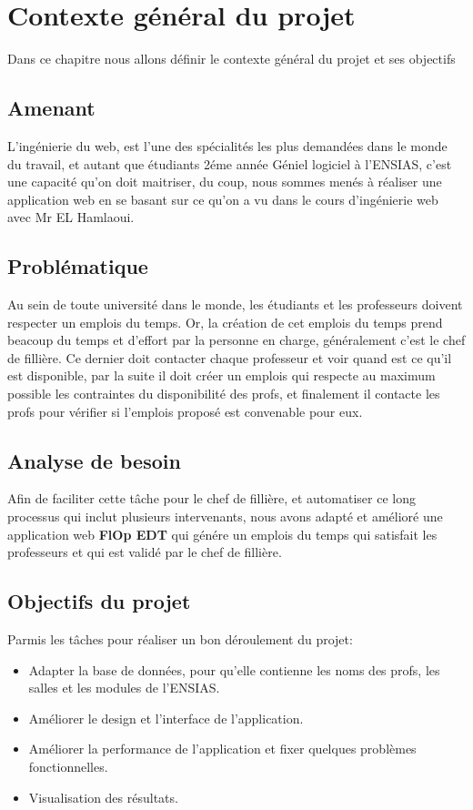 \chapter{Contexte général du projet}
Dans ce chapitre nous allons définir le contexte général du projet et ses objectifs
\newpage

\section{Amenant}
L'ingénierie du web, est l'une des spécialités les plus demandées dans le monde du travail, et autant que étudiants 2éme année Géniel logiciel à l'ENSIAS, c'est une capacité qu'on doit maitriser, du coup, nous sommes menés à réaliser une application web en se  basant sur ce qu'on a vu dans le cours d'ingénierie web avec Mr EL Hamlaoui.\\


\section{Problématique}
Au sein de toute université dans le monde, les étudiants et les professeurs doivent respecter un emplois du temps. Or, la création de cet emplois du temps prend beacoup du temps et d'effort par la personne en charge, généralement c'est le chef de fillière. Ce dernier doit contacter chaque professeur et voir quand est ce qu'il est disponible, par la suite il doit créer un emplois qui respecte au maximum possible les contraintes du disponibilité des profs, et finalement il contacte les profs pour vérifier si l'emplois proposé est convenable pour eux.\\


\section{Analyse de besoin}
Afin de faciliter cette tâche pour le chef de fillière, et automatiser ce long processus qui inclut plusieurs intervenants, nous avons adapté et amélioré une application web \textbf{FlOp EDT} qui génére un emplois du temps qui satisfait les professeurs et qui est validé par le chef de fillière.\\

\section{Objectifs du projet}
Parmis les tâches pour réaliser un bon déroulement du projet:\\
\begin{itemize}
\item Adapter la base de données, pour qu'elle contienne les noms des profs, les salles et les modules de l'ENSIAS.
\item Améliorer le design et l'interface de l'application.
\item Améliorer la performance de l'application et fixer quelques problèmes fonctionnelles.
\item Visualisation des résultats.
\end{itemize}

